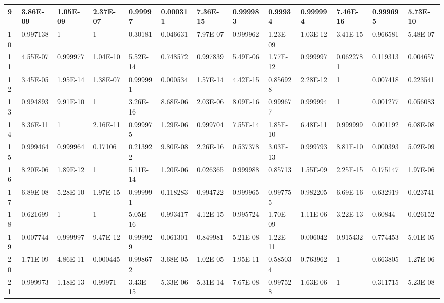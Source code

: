 \documentclass[a4paper,10pt]{article}
\begin{document}
\begin{centering}
{\begin{tabular}{ |l|l|l|l|l|l|l|l|l|l|l|l|l| }
9 	       & 3.86E-09 & 1.05E-09 & 2.37E-07 & 0.99997  & 0.000311 & 7.36E-15 &  0.999983 & 0.99934   & 0.999994 &  7.46E-16 & 0.999695 & 5.73E-10 \\ \hline             
10	       & 0.997138 & 1        & 1 	    & 0.30181  & 0.046631 & 7.97E-07 &  0.999962 & 1.23E-09  & 1.03E-12 &  3.41E-15 & 0.966581 & 5.48E-07 \\ \hline              
11	       & 4.55E-07 & 0.999977 & 1.04E-10 & 5.52E-14 & 0.748572 & 0.997839 &  5.49E-06 & 1.77E-12  & 0.999997 &  0.0622781& 0.119313 & 0.004657 \\ \hline                
12	       & 3.45E-05 & 1.95E-14 & 1.38E-07 & 0.999991 & 0.000534 & 1.57E-14 &  4.42E-15 & 0.856928  & 2.28E-12 &  1        & 0.007418 & 0.223541 \\ \hline         
13	       & 0.994893 & 9.91E-10 & 1 	    & 3.26E-16 & 8.68E-06 & 2.03E-06 &  8.09E-16 & 0.999677  & 0.999994 &  1        & 0.001277 & 0.056083 \\ \hline        
14	       & 8.36E-11 & 1        & 2.16E-11 & 0.999975 & 1.29E-06 & 0.999704 &  7.55E-14 & 1.85E-10  & 6.48E-11 &  0.999999 & 0.001192 & 6.08E-08 \\ \hline               
15	       & 0.999464 & 0.999964 & 0.17106  & 0.213922 & 9.80E-08 & 2.26E-16 &  0.537378 & 3.03E-13  & 0.999793 &  8.81E-10 & 0.000393 & 5.02E-09 \\ \hline               
16	       & 8.20E-06 & 1.89E-12 & 1  	    & 5.11E-14 & 1.20E-06 & 0.026365 &  0.999988 & 0.85713   & 1.55E-09 &  2.25E-15 & 0.175147 & 1.97E-06 \\ \hline             
17	       & 6.89E-08 & 5.28E-10 & 1.97E-15 & 0.999991 & 0.118283 & 0.994722 &  0.999965 & 0.997755  & 0.982205 &  6.69E-16 & 0.632919 & 0.023741 \\ \hline              
18	       & 0.621699 & 1        & 1   	    & 5.05E-16 & 0.993417 & 4.12E-15 &  0.995724 & 1.70E-09  & 1.11E-06 &  3.22E-13 & 0.60844  & 0.026152 \\ \hline             
19	       & 0.007744 & 0.999997 & 9.47E-12 & 0.999929 & 0.061301 & 0.849981 &  5.21E-08 & 1.22E-11  & 0.006042 &  0.915432 & 0.774453 & 5.01E-05 \\ \hline                
20	       & 1.71E-09 & 4.86E-11 & 0.000445 & 0.998672 & 3.68E-05 & 1.02E-05 &  1.95E-11 & 0.585034  & 0.763962 &  1        & 0.663805 & 1.27E-06 \\ \hline      
21	       & 0.999973 & 1.18E-13 & 0.99971  & 3.43E-15 & 5.33E-06 & 5.31E-14 &  7.67E-08 & 0.997528  & 1.63E-06 &  1        & 0.311715 & 5.23E-08 \\ \hline      

\end{tabular}}
\end{centering}
\end{document}

